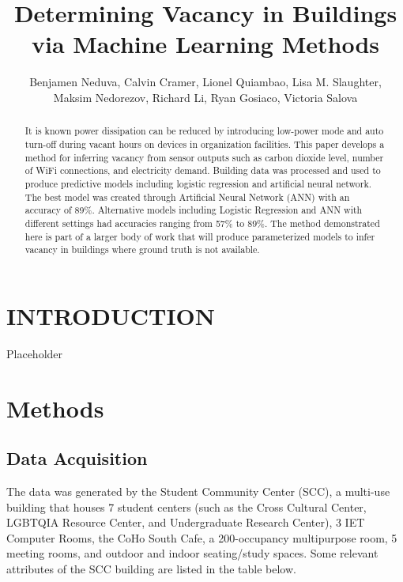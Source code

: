 \documentclass[letterpaper, 12 pt, conference]{ieeeconf}  %
\title{\LARGE \bf
Determining Vacancy in Buildings via Machine Learning Methods
}
\author{Benjamen Neduva, Calvin Cramer, Lionel Quiambao, Lisa M. Slaughter, \\
        Maksim Nedorezov, Richard Li, Ryan Gosiaco, Victoria Salova}
\begin{document}
\maketitle
\thispagestyle{empty}
\pagestyle{empty}


\begin{abstract}

It is known power dissipation can be reduced by introducing low-power mode and auto turn-off during vacant hours on devices in organization facilities. This paper develops a method for inferring vacancy from sensor outputs such as carbon dioxide level, number of WiFi connections, and electricity demand. Building data was processed and used to produce predictive models including logistic regression and artificial neural network. The best model was created through Artificial Neural Network (ANN) with an accuracy of 89\%. Alternative models including Logistic Regression and ANN with different settings had accuracies ranging from 57\% to 89\%. The method demonstrated here is part of a larger body of work that will produce parameterized models to infer vacancy in buildings where ground truth is not available. 


\end{abstract}


\section{INTRODUCTION}

Placeholder

\section{Methods}

\subsection{Data Acquisition}

The data was generated by the Student Community Center (SCC), a multi-use building that houses 7 student centers (such as the Cross Cultural Center, LGBTQIA Resource Center, and Undergraduate Research Center), 3 IET Computer Rooms, the CoHo South Cafe, a 200-occupancy multipurpose room, 5 meeting rooms, and outdoor and indoor seating/study spaces. Some relevant attributes of the SCC building are listed in the table below. 
\end{document}
